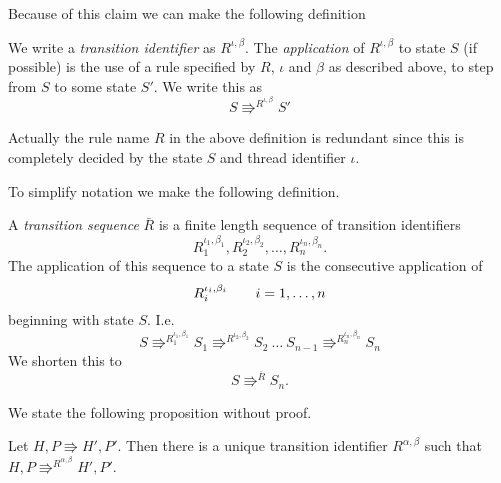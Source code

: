 Because of this claim we can make the following definition

\begin{definition} \label{def:trans_id}
  We write a \emph{transition identifier} as $R^{\iota, \beta}$. The
  \emph{application} of $R^{\iota, \beta}$ to state $S$ (if possible) is the
  use of a rule specified by $R$, $\iota$ and $\beta$ as described above, to
  step from $S$ to some state $S'$. We write this as
  \begin{equation*}
    S \Rrightarrow^{R^{\iota, \beta}} S'
  \end{equation*}
\end{definition}

\begin{remark}
  Actually the rule name $R$ in the above definition is redundant since this is
  completely decided by the state $S$ and thread identifier $\iota$.
\end{remark}

To simplify notation we make the following definition.

\begin{definition}
  A \emph{transition sequence} $\bar{R}$ is a finite length sequence of
  transition identifiers
  \begin{equation*}
    R_1^{\iota_1, \beta_1}, R_2^{\iota_2, \beta_2}, \dots, R_n^{\iota_n,
    \beta_n}.
  \end{equation*}
  The application of this sequence to a state $S$ is the consecutive application
  of
  \begin{equation*}
    R_i^{\iota_i, \beta_i} \quad\quad i = 1, \dots, n
  \end{equation*}
  beginning with state $S$. I.e.
  \begin{equation*} 
    S \Rrightarrow^{R_1^{\iota_1, \beta_1}} S_1 \Rrightarrow^{R^{\iota_2,
    \beta_2}} S_2  \: \dots \: S_{n-1} \Rrightarrow^{R_n^{\iota_n, \beta_n}} S_n
  \end{equation*}
  We shorten this to
  \begin{equation*}
    S \Rrightarrow^{\bar{R}} S_n.
  \end{equation*}
\end{definition}

We state the following proposition without proof.
\begin{proposition} \label{prop:uniq_trans}
  Let $H, P \Rrightarrow H', P'$. Then there is a unique transition identifier
  $R^{\alpha, \beta}$ such that $H, P \Rrightarrow^{R^{\alpha, \beta}} H', P'$.
\end{proposition}

